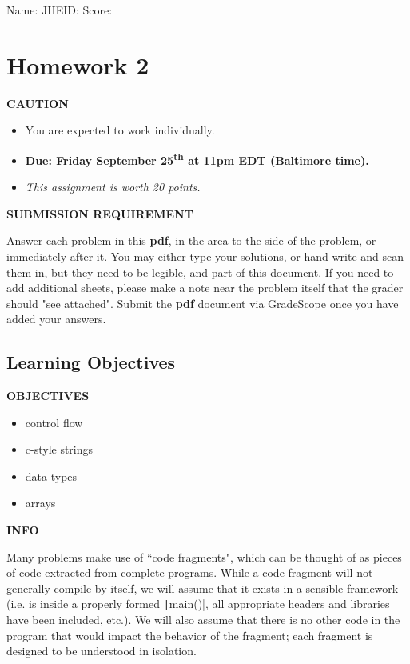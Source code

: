 \documentclass[12pt]{article}
\def \HWNumber {2}
\def \HWDueDate {Friday September 25\textsuperscript{th} at 11pm EDT (Baltimore time)}
\newenvironment{caution}{\par\begin{mdframed}[linewidth=1pt,linecolor=YellowOrange]%
		\begin{list}{}{\leftmargin=0cm}\item[\Large\bcdanger]}
		{\end{list}\end{mdframed}\par}
\newenvironment{danger}{\par\begin{mdframed}[linewidth=1pt,linecolor=Red]%
		\begin{list}{}{\leftmargin=0cm}\item[\Large\bcbombe]}
		{\end{list}\end{mdframed}\par}
\newenvironment{tip}{\par\begin{mdframed}[linewidth=1pt,linecolor=ForestGreen]%
		\begin{list}{}{\leftmargin=0cm}\item[\Large\bclampe]}
		{\end{list}\end{mdframed}\par}
\newenvironment{info}{\par\begin{mdframed}[linewidth=1pt,linecolor=Cerulean]%
		\begin{list}{}{\leftmargin=0cm}\item[\Large\bcinfo]}
		{\end{list}\end{mdframed}\par}
\def \SName {}
\def \JHEID {}
\begin{document}
\noindent Name: \framebox[5.5cm]{\SName\rule{0pt}{12pt}} \hfill
JHEID: \framebox[3cm]{\JHEID\rule{0pt}{12pt}}\hfill
Score: \framebox[2cm]{\rule{0pt}{12pt}}

\section*{Homework \HWNumber}

\begin{caution}
	\textbf{CAUTION}
	
	\begin{itemize}
		\item You are expected to work individually.
		\item \textbf{Due: \HWDueDate.}
		\item \textit{This assignment is worth 20 points. }
	\end{itemize}
\end{caution}

\begin{danger}
	\textbf{SUBMISSION REQUIREMENT}
	
	Answer each problem in this \textbf{pdf}, in the area to the side of the problem, or immediately after it.  You may either type your solutions, or hand-write and scan them in, but they need to be legible, and part of this document. If you need to add additional sheets, please make a note near the problem itself that the grader should "see attached". Submit the \textbf{pdf} document via GradeScope once you have added your answers.
\end{danger}

\subsection*{Learning Objectives}
\begin{tip}
	\textbf{OBJECTIVES}
	
	\begin{itemize}
		\item control flow
		\item c-style strings
		\item data types
		\item arrays
	\end{itemize}
\end{tip}

\begin{info}
	\textbf{INFO}
	
	Many problems make use of “code fragments", which can be thought of as pieces of code extracted from complete programs. While a code fragment will not generally compile by itself, we will assume that it exists in a sensible framework (i.e. is inside a properly formed \texttt|main()|, all appropriate headers and libraries have been included, etc.). We will also assume that there is no other code in the program that would impact the behavior of the fragment; each fragment is designed to be understood in isolation.
\end{info}
\end{document}
